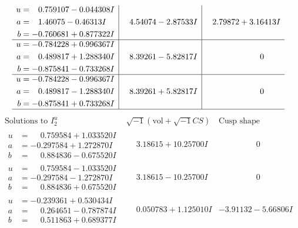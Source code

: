 \documentclass[1p]{elsarticle_modified}
\theoremstyle{definition}
\newcommand{\I}{\sqrt{-1}}
\begin{document}
$$\begin{array}{c|c|c}
\begin{aligned}
u &= \phantom{-}0.759107 - 0.044308 I \\
a &= \phantom{-}1.46075 - 0.46313 I \\
b &= -0.760681 + 0.877322 I\end{aligned}
 & \phantom{-}4.54074 - 2.87533 I & \phantom{-}2.79872 + 3.16413 I \\ \hline\begin{aligned}
u &= -0.784228 + 0.996367 I \\
a &= \phantom{-}0.489817 + 1.288340 I \\
b &= -0.875841 - 0.733268 I\end{aligned}
 & \phantom{-}8.39261 - 5.82817 I & \phantom{-0.000000 } 0 \\ \hline\begin{aligned}
u &= -0.784228 - 0.996367 I \\
a &= \phantom{-}0.489817 - 1.288340 I \\
b &= -0.875841 + 0.733268 I\end{aligned}
 & \phantom{-}8.39261 + 5.82817 I & \phantom{-0.000000 } 0\\
 \hline 
 \end{array}$$\newpage$$\begin{array}{c|c|c}  
\text{Solutions to }I^u_{2}& \I (\text{vol} + \sqrt{-1}CS) & \text{Cusp shape}\\
 \hline 
\begin{aligned}
u &= \phantom{-}0.759584 + 1.033520 I \\
a &= -0.297584 + 1.272870 I \\
b &= \phantom{-}0.884836 - 0.675520 I\end{aligned}
 & \phantom{-}3.18615 + 10.25700 I & \phantom{-0.000000 } 0 \\ \hline\begin{aligned}
u &= \phantom{-}0.759584 - 1.033520 I \\
a &= -0.297584 - 1.272870 I \\
b &= \phantom{-}0.884836 + 0.675520 I\end{aligned}
 & \phantom{-}3.18615 - 10.25700 I & \phantom{-0.000000 } 0 \\ \hline\begin{aligned}
u &= -0.239361 + 0.530434 I \\
a &= \phantom{-}0.264651 - 0.787874 I \\
b &= \phantom{-}0.511863 + 0.689377 I\end{aligned}
 & \phantom{-}0.050783 + 1.125010 I & -3.91132 - 5.66806 I \\ \hline\begin{aligned}

\end{aligned}
\end{array}$$
\end{document}
